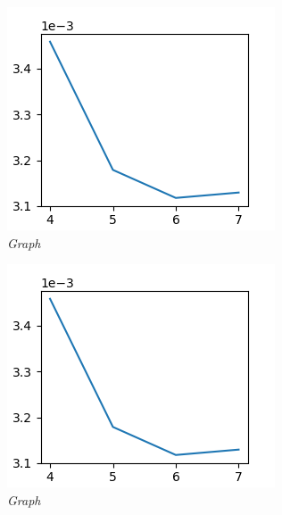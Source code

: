 \documentclass{article}
\begin{document}
            \begin{figure}[!ht]
                \begin{subfigure}{.33\linewidth}
                    \centering
                    \includegraphics[width=.8\linewidth]{pics/hpp-d.png}
                    \caption{\textit{Graph}}
                \end{subfigure}
                \begin{subfigure}{.33\linewidth}
                    \centering
                    \includegraphics[width=.8\linewidth]{pics/hpp-d.png}
                    \caption{\textit{Graph}}
                \end{subfigure}
                \begin{subfigure}{.33\linewidth}
                    \centering

\end{subfigure}
\end{figure}
\end{document}
